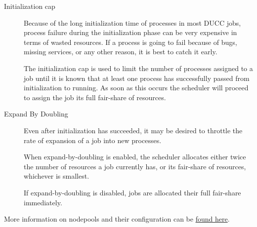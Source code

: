 \begin{description}
        \item[Initialization cap] Because of the long initialization time of processes in most DUCC jobs,
          process failure during the initialization phase can be very expensive in terms of wasted
          resources. If a process is going to fail because of bugs, missing services, or any other
          reason, it is best to catch it early.

          The initialization cap is used to limit the number of processes assigned to a job until it is 
          known that at least one process has successfully passed from initialization to running. As soon 
          as this occurs the scheduler will proceed to assign the job its full fair-share of resources. 

        \item[Expand By Doubling] Even after initialization has succeeded, it may be desired to throttle
          the rate of expansion of a job into new processes. 

          When expand-by-doubling is enabled, the scheduler allocates either twice the number of 
          resources a job currently has, or its fair-share of resources, whichever is smallest. 

          If expand-by-doubling is disabled, jobs are allocated their full fair-share immediately.

    \end{description}
        
    More information on nodepools and their configuration can be \hyperref[subsubsec:class.configuration]{found here}.
